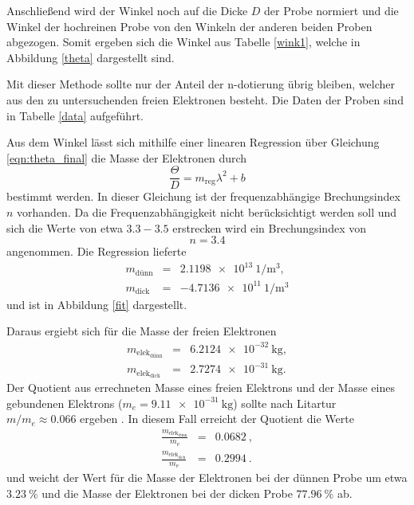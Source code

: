 Anschließend wird der Winkel noch auf die Dicke $D$ der Probe normiert und die Winkel der hochreinen Probe von den Winkeln der anderen beiden Proben abgezogen.
Somit ergeben sich die Winkel aus Tabelle \ref{wink1}, welche in Abbildung \ref{theta} dargestellt sind.

Mit dieser Methode sollte nur der Anteil der n-dotierung übrig bleiben, welcher aus den zu untersuchenden freien Elektronen besteht.
Die Daten der Proben sind in Tabelle \ref{data} aufgeführt.

Aus dem Winkel lässt sich mithilfe einer linearen Regression über Gleichung \eqref{eqn:theta_final} die Masse der Elektronen durch
\begin{equation*}
	\frac{\Theta}{D} = m_\text{reg} \lambda^2 + b
\end{equation*}
bestimmt werden.
In dieser Gleichung ist der frequenzabhängige Brechungsindex $n$ vorhanden. Da die Frequenzabhängigkeit nicht berücksichtigt werden soll und sich die Werte von etwa $3.3-3.5$ \cite{GeAs} erstrecken wird ein Brechungsindex von 
\begin{equation*}
	n = 3.4
\end{equation*}
angenommen.
Die Regression lieferte 
\begin{eqnarray*}
	m_\text{dünn} &=& \SI{ 2.1198e13}{1\per\meter^3},\\
	m_\text{dick} &=& \SI{-4.7136e11}{1\per\meter^3}
\end{eqnarray*}
und ist in Abbildung \ref{fit} dargestellt.

Daraus ergiebt sich für die Masse der freien Elektronen
\begin{eqnarray*}
	m_{\text{elek}_\text{dünn}} &=& \SI{6.2124e-32}{\kilogram},\\
	m_{\text{elek}_\text{dick}} &=& \SI{2.7274e-31}{\kilogram}.
\end{eqnarray*}
Der Quotient aus errechneten Masse eines freien Elektrons und der Masse eines gebundenen Elektrons ($m_e = \SI{9.11e-31}{\kilogram}$) sollte nach Litartur $m/m_e \approx 0.066$ ergeben \cite{kittel}.
In diesem Fall erreicht der Quotient die Werte
\begin{eqnarray*}
	\frac{m_{\text{elek}_\text{dünn}}}{m_\text{e}} &=& \SI{0.0682}{},\\
	\frac{m_{\text{elek}_\text{dick}}}{m_\text{e}} &=& \SI{0.2994}{}.
\end{eqnarray*}
und weicht der Wert für die Masse der Elektronen bei der dünnen Probe um etwa $\SI{3.23}{\percent}$ und die Masse der Elektronen bei der dicken Probe $\SI{77.96}{\percent}$ ab.

